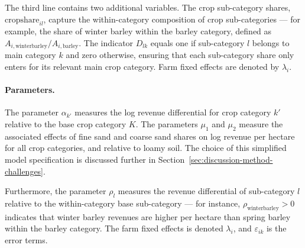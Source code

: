 \documentclass[12pt]{article}
\begin{document}
The third line contains two additional variables.
The crop sub-category shares, $\text{cropshare}_{il}$, capture the within-category composition of crop sub-categories --- for example, the share of winter barley within the barley category, defined as $A_{i,\text{winterbarley}} / A_{i,\text{barley}}$.
The indicator $D_{lk}$ equals one if sub-category $l$ belongs to main category $k$ and zero otherwise, ensuring that each sub-category share only enters for its relevant main crop category.
Farm fixed effects are denoted by $\lambda_i$. 

\paragraph{Parameters.}
The parameter $\alpha_{k'}$ measures the log revenue differential for crop category $k'$ relative to the base crop category $K$.
The parameters $\mu_1$ and $\mu_2$ measure the associated effects of fine sand and coarse sand shares on log revenue per hectare for all crop categories, and relative to loamy soil.
The choice of this simplified model specification is discussed further in Section~\ref{sec:discussion-method-challenges}.

Furthermore, the parameter $\rho_l$ measures the revenue differential of sub-category $l$ relative to the within-category base sub-category --- for instance, $\rho_{\text{winterbarley}} > 0$ indicates that winter barley revenues are higher per hectare than spring barley within the barley category.
The farm fixed effects is denoted $\lambda_i$, and $\varepsilon_{ik}$ is the error terms.
\end{document}
